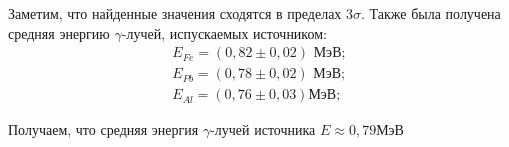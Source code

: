 \documentclass[a4paper,12pt]{report}
\begin{document}
Заметим, что найденные значения сходятся в пределах $3\sigma$.
Также была получена средняя энергию $\gamma$-лучей, испускаемых источником:
\begin{equation*}
\begin{gathered}
    E_{Fe} = (0,82\pm0,02)\text{ МэВ}; \\
    E_{Pb} = (0,78\pm0,02)\text{ МэВ}; \\
    E_{Al} = (0,76\pm0,03)\text{МэВ};
\end{gathered}
\end{equation*}
	
Получаем, что средняя энергия $\gamma$-лучей источника $E \approx 0,79$МэВ
\end{document}
